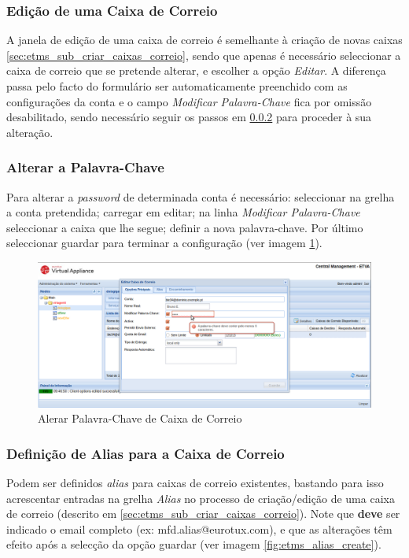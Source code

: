 \subsubsection{Edição de uma Caixa de Correio}
\label{sec:etms_sub_editar_caixas_correio}
A janela de edição de uma caixa de correio é semelhante à criação de novas caixas \ref{sec:etms_sub_criar_caixas_correio}, sendo que apenas é necessário seleccionar a caixa de correio que se pretende alterar, e escolher a opção \textit{Editar}. A diferença passa pelo facto do formulário ser automaticamente preenchido com as configurações da conta e o campo \textit{Modificar Palavra-Chave} fica por omissão desabilitado, sendo necessário seguir os passos em \ref{sec:etms_sub_password_caixas_correio} para proceder à sua alteração.


\subsubsection{Alterar a Palavra-Chave}
\label{sec:etms_sub_password_caixas_correio}
Para alterar a \textit{password} de determinada conta é necessário: seleccionar na grelha a conta pretendida; carregar em editar; na linha \textit{Modificar Palavra-Chave} seleccionar a caixa que lhe segue; definir a nova palavra-chave. Por último seleccionar guardar para terminar a configuração (ver imagem \ref{fig:etms_mb_pass_ed}).

\begin{figure}[H]
    \begin{center}
    \includegraphics[scale=0.35]{screenshots/etms/etms_mb_pass_ed.png}
    \caption{Alerar Palavra-Chave de Caixa de Correio}
    \label{fig:etms_mb_pass_ed}
    \end{center}
\end{figure}

\subsubsection{Definição de Alias para a Caixa de Correio}
\label{sec:etms_sub_alias_caixas_correio}
Podem ser definidos \textit{alias} para caixas de correio existentes, bastando para isso acrescentar entradas na grelha \textit{Alias} no processo de criação/edição de uma caixa de correio (descrito em \ref{sec:etms_sub_criar_caixas_correio}). Note que \textbf{deve} ser indicado o email completo (ex: mfd.alias@eurotux.com), e que as alterações têm efeito após a selecção da opção guardar (ver imagem \ref{fig:etms_alias_create}).

